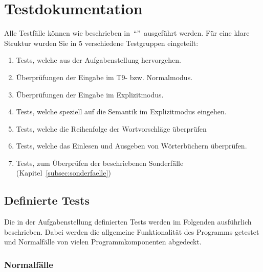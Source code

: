 \chapter{Testdokumentation}\label{ch:testdokumentation}
Alle Testfälle können wie beschrieben in~\enquote{}~ausgeführt werden.
Für eine klare Struktur wurden Sie in 5 verschiedene Testgruppen eingeteilt:
\begin{enumerate}[label={\textbf{Gruppe~\arabic*:}}, ref={Gruppe~\arabic*}, leftmargin=*, noitemsep]
    \label{enm:tesgruppen}
    \item Tests, welche aus der Aufgabenstellung hervorgehen.
    \item Überprüfungen der Eingabe im T9- bzw. Normalmodus.
    \item Überprüfungen der Eingabe im Explizitmodus.
    \item Tests, welche speziell auf die Semantik im Explizitmodus eingehen.
    \item Tests, welche die Reihenfolge der Wortvorschläge überprüfen
    \item Tests, welche das Einlesen und Ausgeben von Wörterbüchern überprüfen.
    \item Tests, zum Überprüfen der beschriebenen Sonderfälle (Kapitel~\ref{subsec:sonderfaelle})
\end{enumerate}



\section{Definierte Tests}\label{sec:definierte-tests}
Die in der Aufgabenstellung definierten Tests werden im Folgenden ausführlich beschrieben.
Dabei werden die allgemeine Funktionalität des Programms getestet und Normalfälle von vielen Programmkomponenten abgedeckt.
\subsection*{Normalfälle}\label{subsec:def-normalfaelle}

